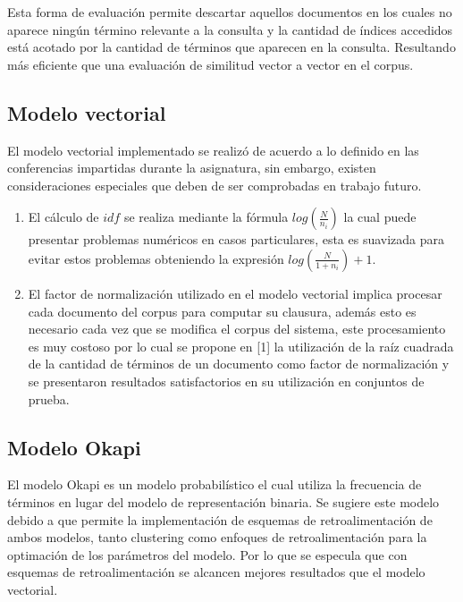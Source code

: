 \documentclass[a4paper,10pt,twocolumn]{article}
\begin{document}
	Esta forma de evaluaci\'on permite descartar aquellos documentos en los cuales no aparece ning\'un
	t\'ermino relevante a la consulta y la cantidad de \'indices accedidos est\'a acotado por la cantidad de 
	t\'erminos que aparecen en la consulta. Resultando m\'as eficiente que una evaluaci\'on de similitud vector
	a vector en el corpus.

	\subsection{Modelo vectorial}\label{sub:figures}
	El modelo vectorial implementado se realiz\'o de acuerdo a lo definido en las conferencias impartidas
	durante la asignatura, sin embargo, existen consideraciones especiales que deben de ser
	comprobadas en trabajo futuro. 

	\begin{enumerate}
		\item El c\'alculo de $idf$ se realiza mediante la f\'ormula $log(\frac{N}{n_i})$ la cual puede presentar
		problemas num\'ericos en casos particulares, esta es suavizada para evitar estos problemas obteniendo
		la expresi\'on $log(\frac{N}{1 + n_i}) + 1$.
		\item El factor de normalizaci\'on utilizado en el modelo vectorial implica procesar cada documento del corpus
		para computar su clausura, adem\'as esto es necesario cada vez que se modifica el corpus del sistema, este procesamiento 
		es muy costoso por lo cual se propone en [1] la utilizaci\'on de la ra\'iz cuadrada de la cantidad de t\'erminos de un documento
		como factor de normalizaci\'on y se presentaron resultados satisfactorios en su utilizaci\'on en conjuntos de prueba.
	\end{enumerate}

	\subsection{Modelo Okapi}\label{sub:figures}

	El modelo Okapi es un modelo probabil\'istico el cual utiliza la frecuencia de t\'erminos en lugar del modelo
	de representaci\'on binaria. Se sugiere este modelo debido a que permite la implementaci\'on de esquemas de retroalimentaci\'on de ambos modelos,
	tanto clustering como enfoques de retroalimentaci\'on para la optimaci\'on de los par\'ametros del modelo. Por lo que se especula que con esquemas de
	retroalimentaci\'on se alcancen mejores resultados que el modelo vectorial.
\end{document}
